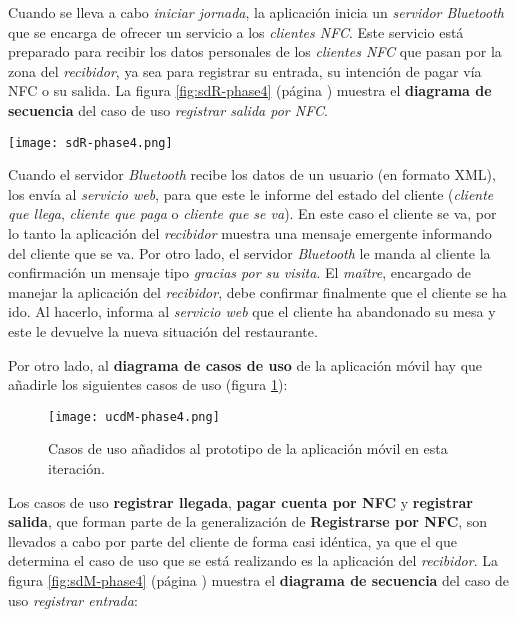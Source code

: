 Cuando se lleva a cabo \emph{iniciar jornada}, la aplicación inicia un
\emph{servidor Bluetooth} que se encarga de ofrecer un servicio a los
\emph{clientes \acs{NFC}}. Este servicio está preparado para recibir
los datos personales de los \emph{clientes \acs{NFC}} que pasan por la
zona del \emph{recibidor}, ya sea para registrar su entrada, su intención de
pagar vía \acs{NFC} o su salida. La figura \ref{fig:sdR-phase4} (página
\pageref{fig:sdR-phase4}) muestra el \textbf{diagrama de secuencia} del
caso de uso \emph{registrar salida por \acs{NFC}}.

  \begin{sidewaysfigure}[!h]
    \begin{center}
      \texttt{[image: sdR-phase4.png]}
      \caption{Diagrama de secuencia del caso de uso \emph{registrar salida
      por \acs{NFC}}.}
      \label{fig:sdR-phase4}
    \end{center}
  \end{sidewaysfigure}

Cuando el servidor \emph{Bluetooth} recibe los datos de un usuario (en formato
\acs{XML}), los envía al \emph{servicio web}, para que este le informe del
estado del cliente (\emph{cliente que llega}, \emph{cliente que paga} o
\emph{cliente que se va}). En este caso el cliente se va, por lo tanto la
aplicación del \emph{recibidor} muestra una mensaje emergente informando
del cliente que se va. Por otro lado, el servidor \emph{Bluetooth} le manda
al cliente la confirmación un mensaje tipo \emph{gracias por su visita}.
El \emph{maître}, encargado de manejar la aplicación del \emph{recibidor},
debe confirmar finalmente que el cliente se ha ido. Al hacerlo, informa
al \emph{servicio web} que el cliente ha abandonado su mesa y este le
devuelve la nueva situación del restaurante.

Por otro lado, al \textbf{diagrama de casos de uso} de la aplicación móvil
hay que añadirle los siguientes casos de uso (figura \ref{fig:ucdM-phase4}):

  \begin{figure}[!h]
    \begin{center}
      \texttt{[image: ucdM-phase4.png]}
      \caption{Casos de uso añadidos al prototipo de la aplicación
      móvil en esta iteración.}
      \label{fig:ucdM-phase4}
    \end{center}
  \end{figure}

Los casos de uso \textbf{registrar llegada}, \textbf{pagar cuenta por
\acs{NFC}} y \textbf{registrar salida}, que forman parte de la generalización
de \textbf{Registrarse por \acs{NFC}}, son llevados a cabo por parte del
cliente de forma casi idéntica, ya que el que determina el caso de uso que
se está realizando es la aplicación del \emph{recibidor}. La figura
\ref{fig:sdM-phase4} (página \pageref{fig:sdM-phase4}) muestra el
\textbf{diagrama de secuencia} del caso de uso \emph{registrar entrada}:

